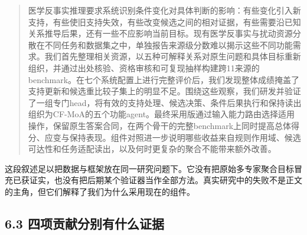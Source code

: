 \documentclass[
  11pt,
  a4paper,
]{article}
\begin{document}
\begin{quote}
医学反事实推理要求系统识别条件变化对具体判断的影响：有些变化引入新支持，有些使旧支持失效，有些改变候选之间的相对证据，有些需要沿已知关系推导后果，还有一些不应影响当前目标。现有医学反事实与扰动资源分散在不同任务和数据集之中，单独报告来源级分数难以揭示这些不同功能需求。我们首先整理相关资源，以五种可解释关系对原生问题和具体目标重新组织，并通过出处核验、资格审核和可复现抽样构建跨11来源的benchmark。在七个系统配置上进行完整评价后，我们发现整体成绩掩盖了支持更新和候选重比较子集上的明显不足。围绕这些观察，我们研发并验证了一组专门head，将有效的支持处理、候选决策、条件后果执行和保持读出组织为CF-MoA的五个功能agent。最终采用版通过输入能力路由选择适用操作，保留原生答案合同，在两个骨干的完整benchmark上同时提高总体得分、应变与保持表现。组件对照进一步说明哪些收益来自规则作用域、候选可达性和任务适配读出，以及何时更复杂的聚合不能带来额外改善。
\end{quote}

这段叙述足以把数据与框架放在同一研究问题下。它没有把原始多专家聚合目标冒充已获证实，也没有把后期某个验证器当作全部方法。真实研究中的失败不是正文的主角，但它们解释了我们为什么采用现在的组件。

\subsection{6.3
四项贡献分别有什么证据}\label{ux56dbux9879ux8d21ux732eux5206ux522bux6709ux4ec0ux4e48ux8bc1ux636e}
\end{document}
